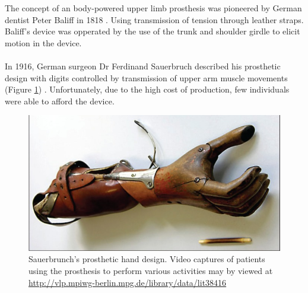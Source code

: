 \documentclass[11pt, a4paper]{article}
\begin{document}
\newpage

\noindent 
The concept of an body-powered upper limb prosthesis was pioneered by German dentist Peter Baliff in 1818 \cite{history_of_arm_amputation}.
Using transmission of tension through leather straps.
Baliff's device was opperated by the use of the trunk and shoulder girdle to elicit motion in the device.
\\ \\
In 1916, German surgeon Dr Ferdinand Sauerbruch described his prosthetic design with digits controlled by transmission of upper arm muscle movements (Figure \ref{fig:SauerbrunchProsthesis}) \cite{sauerbrunch}.
Unfortunately, due to the high cost of production, few individuals were able to afford the device.
\\
\begin{figure}[h]
    \centering
    \includegraphics[scale=0.23]{SauerbrunchProsthesis.jpg}
    \caption{Sauerbrunch's prosthetic hand design. Video captures of patients using the prosthesis to perform various activities may by viewed at \url{http://vlp.mpiwg-berlin.mpg.de/library/data/lit38416}}
    \label{fig:SauerbrunchProsthesis}
\end{figure} 
\end{document}
